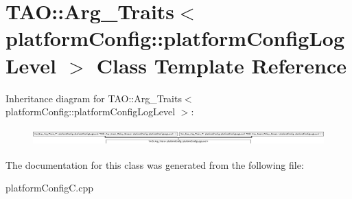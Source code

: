 \section{T\+AO\+:\+:Arg\+\_\+\+Traits$<$ platform\+Config\+:\+:platform\+Config\+Log\+Level $>$ Class Template Reference}
\label{classTAO_1_1Arg__Traits_3_01platformConfig_1_1platformConfigLogLevel_01_4}
Inheritance diagram for T\+AO\+:\+:Arg\+\_\+\+Traits$<$ platform\+Config\+:\+:platform\+Config\+Log\+Level $>$\+:\begin{figure}[H]
\begin{center}
\leavevmode
\includegraphics[height=0.671463cm]{classTAO_1_1Arg__Traits_3_01platformConfig_1_1platformConfigLogLevel_01_4}
\end{center}
\end{figure}


The documentation for this class was generated from the following file\+:\begin{DoxyCompactItemize}
\item 
platform\+Config\+C.\+cpp\end{DoxyCompactItemize}
